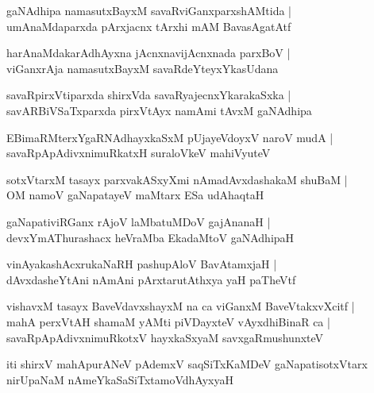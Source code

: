 \documentclass[twoside,12pt,openright]{book}
\newcounter{shloka}[chapter]
\begin{document}
\begin{shloka}%
gaNAdhipa namasutxBayxM savaRviGanxparxshAMtida |\\
umAnaMdaparxda pArxjacnx tArxhi mAM BavasAgatAtf 
\end{shloka}

\begin{shloka}%
harAnaMdakarAdhAyxna jAcnxnavijAcnxnada parxBoV |\\
viGanxrAja namasutxBayxM savaRdeYteyxYkasUdana
\end{shloka}

\begin{shloka}%
savaRpirxVtiparxda shirxVda savaRyajecnxYkarakaSxka |\\
savARBiVSaTxparxda pirxVtAyx namAmi tAvxM gaNAdhipa
\end{shloka}

\begin{shloka}%
EBimaRMterxYgaRNAdhayxkaSxM pUjayeVdoyxV naroV mudA |\\
savaRpApAdivxnimuRkatxH suraloVkeV mahiVyuteV 
\end{shloka}

\begin{shloka}%
sotxVtarxM tasayx parxvakASxyXmi nAmadAvxdashakaM shuBaM |\\
OM namoV gaNapatayeV maMtarx ESa udAhaqtaH 
\end{shloka}

\begin{shloka}%
gaNapativiRGanx rAjoV laMbatuMDoV gajAnanaH |\\
devxYmAThurashacx heVraMba EkadaMtoV gaNAdhipaH
\end{shloka}

\begin{shloka}%
vinAyakashAcxrukaNaRH pashupAloV BavAtamxjaH |\\
dAvxdasheYtAni nAmAni pArxtarutAthxya yaH paTheVtf 
\end{shloka}

\begin{shloka}%
vishavxM tasayx BaveVdavxshayxM na ca viGanxM BaveVtakxvXcitf |\\
mahA perxVtAH shamaM yAMti piVDayxteV vAyxdhiBinaR ca |\\
savaRpApAdivxnimuRkotxV hayxkaSxyaM savxgaRmushunxteV 
\end{shloka}

\begin{center}
iti shirxV mahApurANeV pAdemxV saqSiTxKaMDeV gaNapatisotxVtarx nirUpaNaM nAmeYkaSaSiTxtamoVdhAyxyaH
\end{center}
\end{document}
